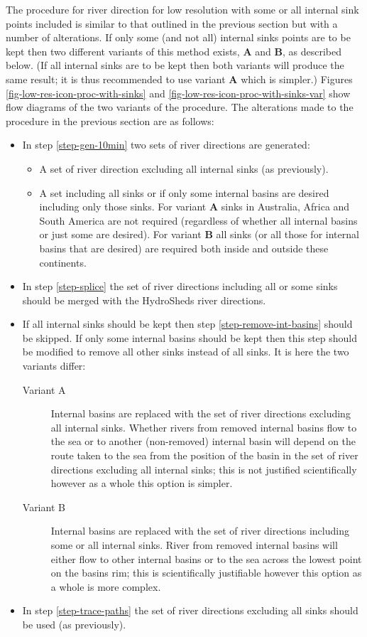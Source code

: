 \documentclass{article}
\begin{document}
\noindent The procedure for river direction for low resolution with some or all internal sink points included is similar to that outlined in the previous section but with a number of alterations. If only some (and not all) internal sinks points are to be kept then two different variants of this method exists, \textbf{A} and  \textbf{B}, as described below. (If all internal sinks are to be kept then both variants will produce the same result; it is thus recommended to use variant \textbf{A}  which is simpler.)  Figures \ref{fig-low-res-icon-proc-with-sinks} and \ref{fig-low-res-icon-proc-with-sinks-var} show flow diagrams of the two variants of the procedure. The alterations made to the procedure in the previous section are as follows:
\begin{itemize}
\item In step \ref{step-gen-10min} two sets of river directions are generated:
\begin{itemize} 
\item A set of river direction excluding all internal sinks (as previously).
 \item A set including all sinks or if only some internal basins are desired including only those sinks. For variant \textbf{A} sinks in Australia, Africa and South America are not required (regardless of whether all internal basins or just some are desired). For variant \textbf{B} all sinks (or all those for internal basins that are desired) are required both inside and outside these continents.
\end{itemize}
\item In step \ref{step-splice} the set of river directions including all or some sinks should be merged with the HydroSheds river directions.
\item If all internal sinks should be kept then step \ref{step-remove-int-basins} should be skipped. If only some internal basins should be kept then this step should be modified to remove all other sinks instead of all sinks. It is here the two variants differ:
\begin{description}
\item[Variant A] Internal basins are replaced with the set of river directions excluding all internal sinks. Whether rivers from removed internal basins flow to the sea or to another (non-removed) internal basin will depend on the route taken to the sea from the position of the basin in the set of river directions excluding all internal sinks; this is not justified scientifically however as a whole this option is simpler.
\item[Variant B] Internal basins are replaced with the set of river directions including some or all internal sinks. River from removed internal basins will either flow to other internal basins or to the sea across the lowest point on the basins rim; this is scientifically justifiable however this option as a whole is more complex.
\end{description}
\item In step \ref{step-trace-paths} the set of river directions excluding all sinks should be used (as previously).
\end{itemize}
\end{document}

